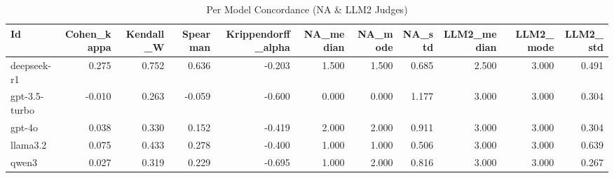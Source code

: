 \begin{table}
\caption{Per Model Concordance (NA & LLM2 Judges)}
\label{tab:per_model_concordance_NA_LLM2_judges}
\begin{tabular}{lrrrrrrrrrr}
\toprule
Id & Cohen_kappa & Kendall_W & Spearman & Krippendorff_alpha & NA_median & NA_mode & NA_std & LLM2_median & LLM2_mode & LLM2_std \\
\midrule
deepseek-r1 & 0.275 & 0.752 & 0.636 & -0.203 & 1.500 & 1.500 & 0.685 & 2.500 & 3.000 & 0.491 \\
gpt-3.5-turbo & -0.010 & 0.263 & -0.059 & -0.600 & 0.000 & 0.000 & 1.177 & 3.000 & 3.000 & 0.304 \\
gpt-4o & 0.038 & 0.330 & 0.152 & -0.419 & 2.000 & 2.000 & 0.911 & 3.000 & 3.000 & 0.304 \\
llama3.2 & 0.075 & 0.433 & 0.278 & -0.400 & 1.000 & 1.000 & 0.506 & 3.000 & 3.000 & 0.639 \\
qwen3 & 0.027 & 0.319 & 0.229 & -0.695 & 1.000 & 2.000 & 0.816 & 3.000 & 3.000 & 0.267 \\
\bottomrule
\end{tabular}
\end{table}
